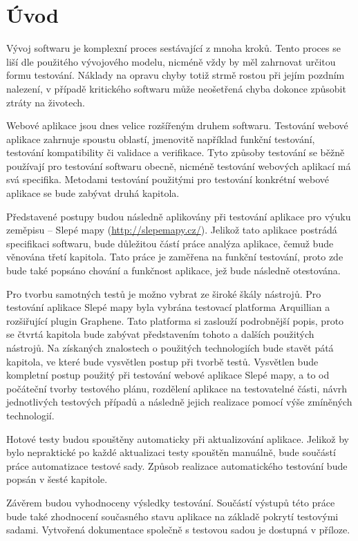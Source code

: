 \documentclass[
    color,   %
	table,   %
    twoside, %
]{fithesis3}
\begin{document}
  \chapter{Úvod}
Vývoj softwaru je komplexní proces sestávající z mnoha kroků. Tento proces se liší dle použitého vývojového modelu, nicméně vždy by měl zahrnovat určitou formu testování. Náklady na opravu chyby totiž strmě rostou při jejím pozdním nalezení, v případě kritického softwaru může neošetřená chyba dokonce způsobit ztráty na životech.

Webové aplikace jsou dnes velice rozšířeným druhem softwaru. Testování webové aplikace zahrnuje spoustu oblastí, jmenovitě například funkční testování, testování kompatibility či validace a verifikace. Tyto způsoby testování se běžně používají pro testování softwaru obecně, nicméně testování webových aplikací má svá specifika. Metodami testování použitými pro testování konkrétní webové aplikace se bude zabývat druhá kapitola.

Představené postupy budou následně aplikovány při testování aplikace pro výuku zeměpisu – Slepé mapy (\url{http://slepemapy.cz/}). Jelikož tato aplikace postrádá specifikaci softwaru, bude důležitou částí práce analýza aplikace, čemuž bude věnována třetí kapitola. Tato práce je zaměřena na funkční testování, proto zde bude také popsáno chování a funkčnost aplikace, jež bude následně otestována.

Pro tvorbu samotných testů je možno vybrat ze široké škály nástrojů. Pro testování aplikace Slepé mapy byla vybrána testovací platforma Arquillian a rozšiřující plugin Graphene. Tato platforma si zaslouží podrobnější popis, proto se čtvrtá kapitola bude zabývat představením tohoto a dalších použitých nástrojů.
Na získaných znalostech o použitých technologiích bude stavět pátá kapitola, ve které bude vysvětlen postup při tvorbě testů. Vysvětlen bude kompletní postup použitý při testování webové aplikace Slepé mapy, a to od počáteční tvorby testového plánu, rozdělení aplikace na testovatelné části, návrh jednotlivých testových případů a následně jejich realizace pomocí výše zmíněných technologií.

Hotové testy budou spouštěny automaticky při aktualizování aplikace. Jelikož by bylo  nepraktické po každé aktualizaci testy spouštěn manuálně, bude součástí práce automatizace testové sady. Způsob realizace automatického testování bude popsán v šesté kapitole.

Závěrem budou vyhodnoceny výsledky testování. Součástí výstupů této práce bude také zhodnocení současného stavu aplikace na základě pokrytí testovými sadami. Vytvořená dokumentace společně s testovou sadou je dostupná v příloze. 
\end{document}
